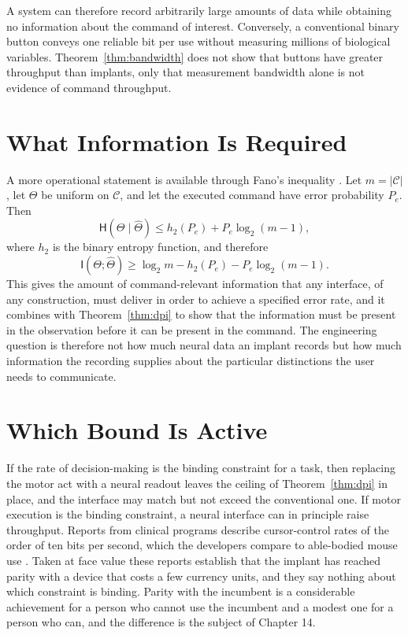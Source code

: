 \documentclass[11pt,twoside,openany]{book}
\theoremstyle{definition}
\theoremstyle{remark}
\newcommand{\C}{\mathcal{C}}
\newcommand{\MI}{\mathsf{I}}
\newcommand{\Hent}{\mathsf{H}}
\newcommand{\Th}{\Theta}
\newcommand{\Thh}{\widehat{\Theta}}
\begin{document}
A system can therefore record arbitrarily large amounts of data while obtaining no information about the command of interest. Conversely, a conventional binary button conveys one reliable bit per use without measuring millions of biological variables. Theorem~\ref{thm:bandwidth} does not show that buttons have greater throughput than implants, only that measurement bandwidth alone is not evidence of command throughput.

\section{What Information Is Required}

A more operational statement is available through Fano's inequality \cite{fano1961,cover2006}. Let $m=|\C|$, let $\Th$ be uniform on $\C$, and let the executed command have error probability $P_e$. Then
\[
\Hent(\Th\mid\Thh)\le h_2(P_e)+P_e\log_2(m-1),
\]
where $h_2$ is the binary entropy function, and therefore
\[
\MI(\Th;\Thh)\ge\log_2 m-h_2(P_e)-P_e\log_2(m-1).
\]
This gives the amount of command-relevant information that any interface, of any construction, must deliver in order to achieve a specified error rate, and it combines with Theorem~\ref{thm:dpi} to show that the information must be present in the observation before it can be present in the command. The engineering question is therefore not how much neural data an implant records but how much information the recording supplies about the particular distinctions the user needs to communicate.

\section{Which Bound Is Active}

If the rate of decision-making is the binding constraint for a task, then replacing the motor act with a neural readout leaves the ceiling of Theorem~\ref{thm:dpi} in place, and the interface may match but not exceed the conventional one. If motor execution is the binding constraint, a neural interface can in principle raise throughput. Reports from clinical programs describe cursor-control rates of the order of ten bits per second, which the developers compare to able-bodied mouse use \cite{neuralink2026}. Taken at face value these reports establish that the implant has reached parity with a device that costs a few currency units, and they say nothing about which constraint is binding. Parity with the incumbent is a considerable achievement for a person who cannot use the incumbent and a modest one for a person who can, and the difference is the subject of Chapter 14.
\end{document}

